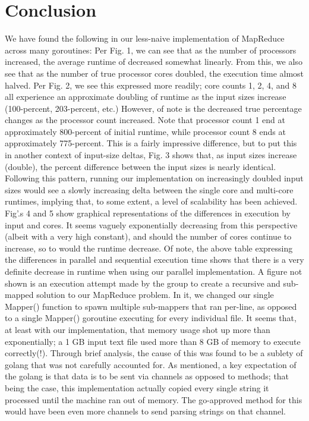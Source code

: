\documentclass[report]{IEEEtran}
\begin{document}
\section{Conclusion}
We have found the following in our less-naive implementation of MapReduce across many goroutines: Per Fig. 1, we can see that as the number of processors increased, the average runtime of decreased somewhat linearly. From this, we also see that as the number of true processor cores doubled, the execution time almost halved.  Per Fig. 2, we see this expressed more readily; core counts 1, 2, 4, and 8 all experience an approximate doubling of runtime as the input sizes increase (100-percent, 203-percent, etc.) However, of note is the decreased true percentage changes as the processor count increased. Note that processor count 1 end at approximately 800-percent of initial runtime, while processor count 8 ends at approximately 775-percent. This is a fairly impressive difference, but to put this in another context of input-size deltas, Fig. 3 shows that, as input sizes increase (double), the percent difference between the input sizes is nearly identical. Following this pattern, running our implementation on increasingly doubled input sizes would see a slowly increasing delta between the single core and multi-core runtimes, implying that, to some extent, a level of scalability has been achieved.
Fig'.s 4 and 5 show graphical representations of the differences in execution by input and cores. It seems vaguely exponentially decreasing from this perspective (albeit with a very high constant), and should the number of cores continue to increase, so to would the runtime decrease. Of note, the above table expressing the differences in parallel and sequential execution time shows that there is a very definite decrease in runtime when using our parallel implementation.
A figure not shown is an execution attempt made by the group to create a recursive and sub-mapped solution to our MapReduce problem. In it, we changed our single Mapper() function to spawn multiple sub-mappers that ran per-line, as opposed to a single Mapper() goroutine executing for every individual file. It seems that, at least with our implementation, that memory usage shot up more than exponentially; a 1 GB input text file used more than 8 GB of memory to execute correctly(!). Through brief analysis, the cause of this was found to be a sublety of golang that was not carefully accounted for. As mentioned, a key expectation of the golang is that data is to be sent via channels as opposed to methods; that being the case, this implementation actually copied every single string it processed until the machine ran out of memory. The go-approved method for this would have been even more channels to send parsing strings on that channel.
\end{document}
